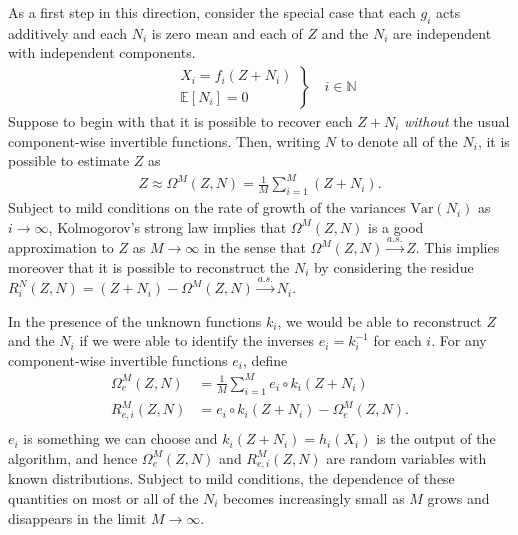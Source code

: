 As a first step in this direction, consider the special case that each ${g}_i$ acts additively and each $N_i$ is zero mean and each of $Z$ and the $N_i$ are independent with independent components.
%
\begin{align}
\left.
\begin{array}{ll}
&X_{i}={f}_{i}(Z + N_{i}) \\
&\mathbb{E}[N_i]= 0
\end{array}
\right\rbrace \quad i \in \mathbb{N}
\end{align}
%
Suppose to begin with that it is possible to recover each $Z + N_i$ \emph{without} the usual component-wise invertible functions. Then, writing $N$ to denote all of the $N_i$, it is possible to estimate $Z$ as
\begin{align*}
Z \approx \Omega^M(Z, N) = \frac{1}{M}\sum_{i=1}^M \left(Z + N_i\right).
\end{align*}
Subject to mild conditions on the rate of growth of the variances $\text{Var}(N_i)$ as $i\to\infty$, Kolmogorov's strong law implies that $\Omega^M(Z, N)$ is a good approximation to $Z$ as $M\to\infty$ in the sense that  $\Omega^M(Z, N) \overset{a.s.}{\longrightarrow} Z$.
This implies moreover that it is possible to reconstruct the $N_i$ by considering the residue $R^N_i(Z, N) = (Z + N_i) - \Omega^M(Z, N) \overset{a.s.}{\longrightarrow} N_i$.

In the presence of the unknown functions ${k}_i$, we would be able to reconstruct $Z$ and the $N_i$ if we were able to identify the inverses ${e}_i = {k}_i^{-1}$ for each $i$.
For any component-wise invertible functions ${e}_i$, define
\begin{align*}
\Omega_{e}^M(Z, N) &= \frac{1}{M} \sum_{i=1}^M {e}_i\circ {k}_i( Z + N_i) \\
R_{{e}, i}^M(Z, N) &= {e}_i\circ {k}_i( Z + N_i) - \Omega_{{e}}^M(Z, N).\\
\end{align*}
${e}_i$ is something we can choose and ${k}_i(Z+N_i) = {h}_i({X}_i)$ is the output of the algorithm, and hence $\Omega_{e}^M(Z, N)$ and $R_{{e}, i}^M(Z, N)$ are random variables with known distributions.
Subject to mild conditions, the dependence of these quantities on most or all of the $N_i$ becomes increasingly small as $M$ grows and disappears in the limit $M\to\infty$.

\medskip

